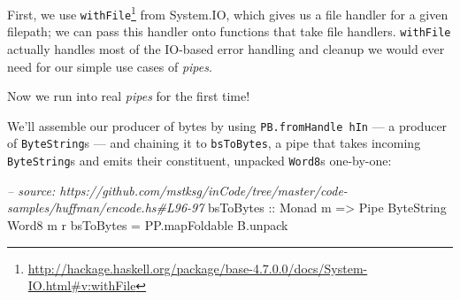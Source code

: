 \documentclass[]{article}
\newenvironment{Shaded}{}{}
\newcommand{\KeywordTok}[1]{\textcolor[rgb]{0.00,0.44,0.13}{\textbf{{#1}}}}
\newcommand{\DataTypeTok}[1]{\textcolor[rgb]{0.56,0.13,0.00}{{#1}}}
\newcommand{\DecValTok}[1]{\textcolor[rgb]{0.25,0.63,0.44}{{#1}}}
\newcommand{\CommentTok}[1]{\textcolor[rgb]{0.38,0.63,0.69}{\textit{{#1}}}}
\newcommand{\OtherTok}[1]{\textcolor[rgb]{0.00,0.44,0.13}{{#1}}}
\newcommand{\FunctionTok}[1]{\textcolor[rgb]{0.02,0.16,0.49}{{#1}}}
\newcommand{\NormalTok}[1]{{#1}}
\renewcommand{\href}[2]{#2\footnote{\url{#1}}}
\begin{document}
\begin{Shaded}
\end{Shaded}

First, we use
\href{http://hackage.haskell.org/package/base-4.7.0.0/docs/System-IO.html\#v:withFile}{\texttt{withFile}}
from System.IO, which gives us a file handler for a given filepath; we can pass
this handler onto functions that take file handlers. \texttt{withFile} actually
handles most of the IO-based error handling and cleanup we would ever need for
our simple use cases of \emph{pipes}.

Now we run into real \emph{pipes} for the first time!

We'll assemble our producer of bytes by using \texttt{PB.fromHandle\ hIn} --- a
producer of \texttt{ByteString}s --- and chaining it to \texttt{bsToBytes}, a
pipe that takes incoming \texttt{ByteString}s and emits their constituent,
unpacked \texttt{Word8}s one-by-one:

\begin{Shaded}
\begin{Highlighting}[]
\CommentTok{-- source: https://github.com/mstksg/inCode/tree/master/code-samples/huffman/encode.hs#L96-97}
\OtherTok{bsToBytes ::} \DataTypeTok{Monad} \NormalTok{m }\OtherTok{=>} \DataTypeTok{Pipe} \DataTypeTok{ByteString} \DataTypeTok{Word8} \NormalTok{m r}
\NormalTok{bsToBytes }\FunctionTok{=} \NormalTok{PP.mapFoldable B.unpack}
\end{Highlighting}
\end{Shaded}
\end{document}
